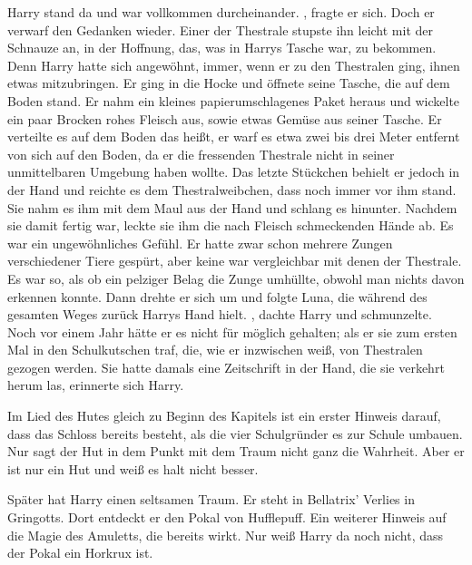 Harry stand da und war vollkommen durcheinander. , fragte er sich. Doch er verwarf den Gedanken wieder. Einer der Thestrale stupste ihn leicht mit der Schnauze an, in der Hoffnung, das, was in Harrys Tasche war, zu bekommen. Denn Harry hatte sich angewöhnt, immer, wenn er zu den Thestralen ging, ihnen etwas mitzubringen. Er ging in die Hocke und öffnete seine Tasche, die auf dem Boden stand. Er nahm ein kleines papierumschlagenes Paket heraus und wickelte ein paar Brocken rohes Fleisch aus, sowie etwas Gemüse aus seiner Tasche. Er verteilte es auf dem Boden \gst das heißt, er warf es etwa zwei bis drei Meter entfernt von sich auf den Boden, da er die fressenden Thestrale nicht in seiner unmittelbaren Umgebung haben wollte. Das letzte Stückchen behielt er jedoch in der Hand und reichte es dem Thestralweibchen, dass noch immer vor ihm stand. Sie nahm es ihm mit dem Maul aus der Hand und schlang es hinunter. Nachdem sie damit fertig war, leckte sie ihm die nach Fleisch schmeckenden Hände ab. Es war ein ungewöhnliches Gefühl. Er hatte zwar schon mehrere Zungen verschiedener Tiere gespürt, aber keine war vergleichbar mit denen der Thestrale. Es war so, als ob ein pelziger Belag die Zunge umhüllte, obwohl man nichts davon erkennen konnte. Dann drehte er sich um und folgte Luna, die während des gesamten Weges zurück Harrys Hand hielt. , dachte Harry und schmunzelte. Noch vor einem Jahr hätte er es nicht für möglich gehalten; als er sie zum ersten Mal in den Schulkutschen traf, die, wie er inzwischen weiß, von Thestralen gezogen werden. Sie hatte damals eine Zeitschrift in der Hand, die sie verkehrt herum las, erinnerte sich Harry.




\begin{kommentar}
Im Lied des Hutes gleich zu Beginn des Kapitels ist ein erster Hinweis darauf, dass das Schloss bereits besteht, als die vier Schulgründer es zur Schule umbauen. Nur sagt der Hut in dem Punkt mit dem Traum nicht ganz die Wahrheit. Aber er ist nur ein Hut und weiß es halt nicht besser.
\end{kommentar}

\begin{kommentar}
Später hat Harry einen seltsamen Traum. Er steht in Bellatrix’ Verlies in Gringotts. Dort entdeckt er den Pokal von Hufflepuff. Ein weiterer Hinweis auf die Magie des Amuletts, die bereits wirkt. Nur weiß Harry da noch nicht, dass der Pokal ein Horkrux ist.
\end{kommentar}

